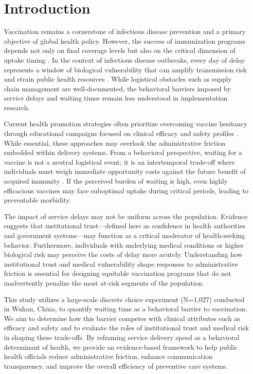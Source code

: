 \documentclass[preprint,12pt,authoryear]{elsarticle}
\begin{document}
\doublespacing

\section{Introduction}
Vaccination remains a cornerstone of infectious disease prevention and a primary objective of global health policy. However, the success of immunization programs depends not only on final coverage levels but also on the critical dimension of uptake timing \citep{Chapman2005, Chapman2010}. In the context of infectious disease outbreaks, every day of delay represents a window of biological vulnerability that can amplify transmission risk and strain public health resources \citep{Castioni2024, Shankar2024}. While logistical obstacles such as supply chain management are well-documented, the behavioral barriers imposed by service delays and waiting times remain less understood in implementation research.

Current health promotion strategies often prioritize overcoming vaccine hesitancy through educational campaigns focused on clinical efficacy and safety profiles \citep{MacDonald2015, Anderson2023, Betsch2018}. While essential, these approaches may overlook the administrative friction embedded within delivery systems. From a behavioral perspective, waiting for a vaccine is not a neutral logistical event; it is an intertemporal trade-off where individuals must weigh immediate opportunity costs against the future benefit of acquired immunity \citep{Frederick2002, Attema2025}. If the perceived burden of waiting is high, even highly efficacious vaccines may face suboptimal uptake during critical periods, leading to preventable morbidity.

The impact of service delays may not be uniform across the population. Evidence suggests that institutional trust—defined here as confidence in health authorities and government systems—may function as a critical moderator of health-seeking behavior. Furthermore, individuals with underlying medical conditions or higher biological risk may perceive the costs of delay more acutely. Understanding how institutional trust and medical vulnerability shape responses to administrative friction is essential for designing equitable vaccination programs that do not inadvertently penalize the most at-risk segments of the population.

This study utilizes a large-scale discrete choice experiment (N=1,027) conducted in Wuhan, China, to quantify waiting time as a behavioral barrier to vaccination. We aim to determine how this barrier competes with clinical attributes such as efficacy and safety and to evaluate the roles of institutional trust and medical risk in shaping these trade-offs. By reframing service delivery speed as a behavioral determinant of health, we provide an evidence-based framework to help public health officials reduce administrative friction, enhance communication transparency, and improve the overall efficiency of preventive care systems.
\end{document}
